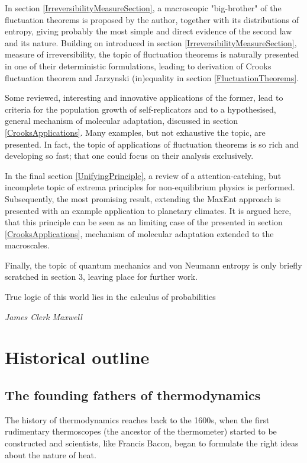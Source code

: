 \documentclass[a4paper,12pt]{article}
\begin{document}
In section \ref{IrreversibilityMeasureSection}, a macroscopic "big-brother" of the fluctuation theorems is proposed by the author, together with its distributions of entropy, giving probably the most simple and direct evidence of the second law and its nature. Building on introduced in section \ref{IrreversibilityMeasureSection}, measure of irreversibility, the topic of fluctuation theorems is naturally presented in one of their deterministic formulations, leading to derivation of Crooks fluctuation theorem and Jarzynski (in)equality in section \ref{FluctuationTheorems}.

Some reviewed, interesting and innovative applications of the former, lead to criteria for the population growth of self-replicators and to a hypothesised, general mechanism of molecular adaptation, discussed in section \ref{CrooksApplications}. Many examples, but not exhaustive the topic, are presented. In fact, the topic of applications of fluctuation theorems is so rich and developing so fast; that one could focus on their analysis exclusively.

In the final section \ref{UnifyingPrinciple}, a review of a attention-catching, but incomplete topic of extrema principles for non-equilibrium physics is performed. Subsequently, the most promising result, extending the MaxEnt approach is presented with an example application to planetary climates.
It is argued here, that this principle can be seen as an limiting case of the presented in section \ref{CrooksApplications}, mechanism of molecular adaptation extended to the macroscales.

Finally, the topic of quantum mechanics and von Neumann entropy is only briefly scratched in section 3, leaving place for further work.


\newpage
\epigraph{True logic of this world lies in the calculus of probabilities}{\textit{James Clerk Maxwell}}
\section{Historical outline}
\subsection{The founding fathers of thermodynamics}
The history of thermodynamics reaches back to the 1600s, when the first rudimentary thermoscopes (the ancestor of the thermometer) started to be constructed and scientists, like Francis Bacon, began to formulate the right ideas about the nature of heat. 
\end{document}
